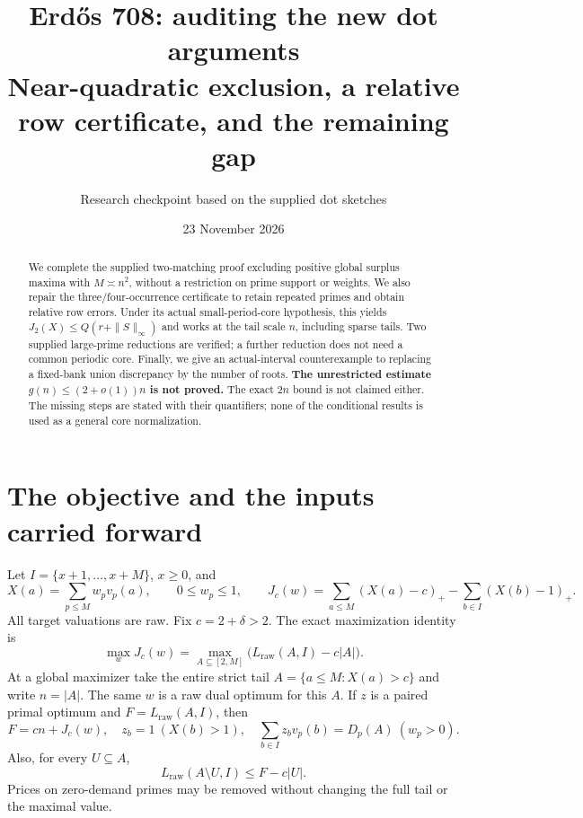 \documentclass[11pt,a4paper]{article}
\title{Erd\H{o}s 708: auditing the new dot arguments\\
\large Near-quadratic exclusion, a relative row certificate, and the remaining gap}
\author{Research checkpoint based on the supplied dot sketches}
\date{23 November 2026}
\newcommand{\pos}[1]{\left(#1\right)_+}
\newcommand{\LP}{L_{\mathrm{raw}}}
\begin{document}
\maketitle
\begin{abstract}
We complete the supplied two-matching proof excluding positive global
surplus maxima with $M\asymp n^2$, without a restriction on prime support
or weights. We also repair the three/four-occurrence certificate to retain
repeated primes and obtain relative row errors. Under its actual
small-period-core hypothesis, this yields $J_2(X)\le Q(r+\|S\|_\infty)$
and works at the tail scale $n$, including sparse tails. Two supplied
large-prime reductions are verified; a further reduction does not need a
common periodic core. Finally, we give an actual-interval counterexample
to replacing a fixed-bank union discrepancy by the number of roots.
\textbf{The unrestricted estimate $g(n)\le(2+o(1))n$ is not proved.}
The exact $2n$ bound is not claimed either. The missing steps are stated
with their quantifiers; none of the conditional results is used as a
general core normalization.
\end{abstract}

\section{The objective and the inputs carried forward}

Let $I=\{x+1,\ldots,x+M\}$, $x\ge0$, and
\[
 X(a)=\sum_{p\le M}w_pv_p(a),\qquad 0\le w_p\le1,
 \qquad J_c(w)=\sum_{a\le M}\pos{X(a)-c}-\sum_{b\in I}\pos{X(b)-1}.
\]
All target valuations are raw. Fix $c=2+\delta>2$. The exact maximization
identity is
\begin{equation}
 \max_wJ_c(w)=\max_{A\subseteq[2,M]}
       \bigl(\LP(A,I)-c|A|\bigr).                     \label{eq:global}
\end{equation}
At a global maximizer take the entire strict tail
$A=\{a\le M:X(a)>c\}$ and write $n=|A|$. The same $w$ is a raw dual
optimum for this $A$. If $z$ is a paired primal optimum and
$F=\LP(A,I)$, then
\begin{equation}
 F=cn+J_c(w),\quad z_b=1\ (X(b)>1),\quad
 \sum_{b\in I}z_bv_p(b)=D_p(A)\ (w_p>0).              \label{eq:paired}
\end{equation}
Also, for every $U\subseteq A$,
\begin{equation}
 \LP(A\setminus U,I)\le F-c|U|.                      \label{eq:deletion}
\end{equation}
Prices on zero-demand primes may be removed without changing the full
tail or the maximal value.
\end{document}
